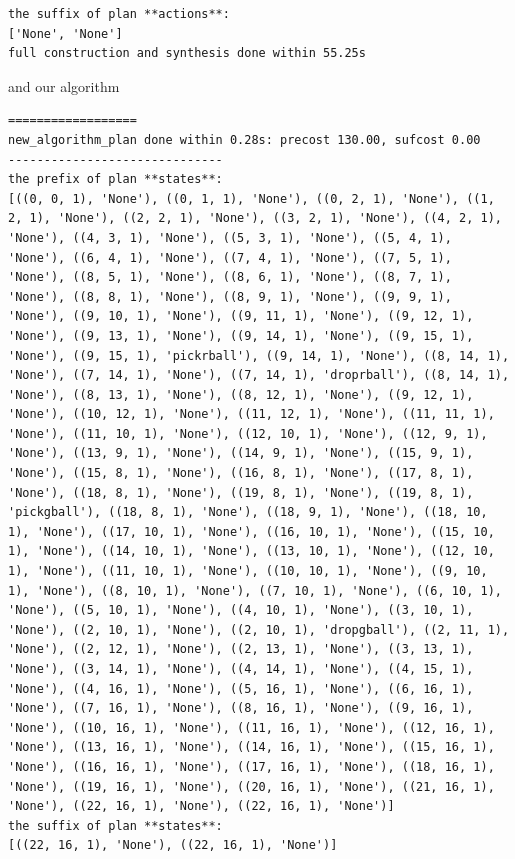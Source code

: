 \begin{lstlisting}
the suffix of plan **actions**:
['None', 'None']
full construction and synthesis done within 55.25s 
\end{lstlisting}
and our algorithm
\begin{lstlisting}
==================
new_algorithm_plan done within 0.28s: precost 130.00, sufcost 0.00
------------------------------
the prefix of plan **states**:
[((0, 0, 1), 'None'), ((0, 1, 1), 'None'), ((0, 2, 1), 'None'), ((1, 2, 1), 'None'), ((2, 2, 1), 'None'), ((3, 2, 1), 'None'), ((4, 2, 1), 'None'), ((4, 3, 1), 'None'), ((5, 3, 1), 'None'), ((5, 4, 1), 'None'), ((6, 4, 1), 'None'), ((7, 4, 1), 'None'), ((7, 5, 1), 'None'), ((8, 5, 1), 'None'), ((8, 6, 1), 'None'), ((8, 7, 1), 'None'), ((8, 8, 1), 'None'), ((8, 9, 1), 'None'), ((9, 9, 1), 'None'), ((9, 10, 1), 'None'), ((9, 11, 1), 'None'), ((9, 12, 1), 'None'), ((9, 13, 1), 'None'), ((9, 14, 1), 'None'), ((9, 15, 1), 'None'), ((9, 15, 1), 'pickrball'), ((9, 14, 1), 'None'), ((8, 14, 1), 'None'), ((7, 14, 1), 'None'), ((7, 14, 1), 'droprball'), ((8, 14, 1), 'None'), ((8, 13, 1), 'None'), ((8, 12, 1), 'None'), ((9, 12, 1), 'None'), ((10, 12, 1), 'None'), ((11, 12, 1), 'None'), ((11, 11, 1), 'None'), ((11, 10, 1), 'None'), ((12, 10, 1), 'None'), ((12, 9, 1), 'None'), ((13, 9, 1), 'None'), ((14, 9, 1), 'None'), ((15, 9, 1), 'None'), ((15, 8, 1), 'None'), ((16, 8, 1), 'None'), ((17, 8, 1), 'None'), ((18, 8, 1), 'None'), ((19, 8, 1), 'None'), ((19, 8, 1), 'pickgball'), ((18, 8, 1), 'None'), ((18, 9, 1), 'None'), ((18, 10, 1), 'None'), ((17, 10, 1), 'None'), ((16, 10, 1), 'None'), ((15, 10, 1), 'None'), ((14, 10, 1), 'None'), ((13, 10, 1), 'None'), ((12, 10, 1), 'None'), ((11, 10, 1), 'None'), ((10, 10, 1), 'None'), ((9, 10, 1), 'None'), ((8, 10, 1), 'None'), ((7, 10, 1), 'None'), ((6, 10, 1), 'None'), ((5, 10, 1), 'None'), ((4, 10, 1), 'None'), ((3, 10, 1), 'None'), ((2, 10, 1), 'None'), ((2, 10, 1), 'dropgball'), ((2, 11, 1), 'None'), ((2, 12, 1), 'None'), ((2, 13, 1), 'None'), ((3, 13, 1), 'None'), ((3, 14, 1), 'None'), ((4, 14, 1), 'None'), ((4, 15, 1), 'None'), ((4, 16, 1), 'None'), ((5, 16, 1), 'None'), ((6, 16, 1), 'None'), ((7, 16, 1), 'None'), ((8, 16, 1), 'None'), ((9, 16, 1), 'None'), ((10, 16, 1), 'None'), ((11, 16, 1), 'None'), ((12, 16, 1), 'None'), ((13, 16, 1), 'None'), ((14, 16, 1), 'None'), ((15, 16, 1), 'None'), ((16, 16, 1), 'None'), ((17, 16, 1), 'None'), ((18, 16, 1), 'None'), ((19, 16, 1), 'None'), ((20, 16, 1), 'None'), ((21, 16, 1), 'None'), ((22, 16, 1), 'None'), ((22, 16, 1), 'None')]
the suffix of plan **states**:
[((22, 16, 1), 'None'), ((22, 16, 1), 'None')]

\end{lstlisting}
